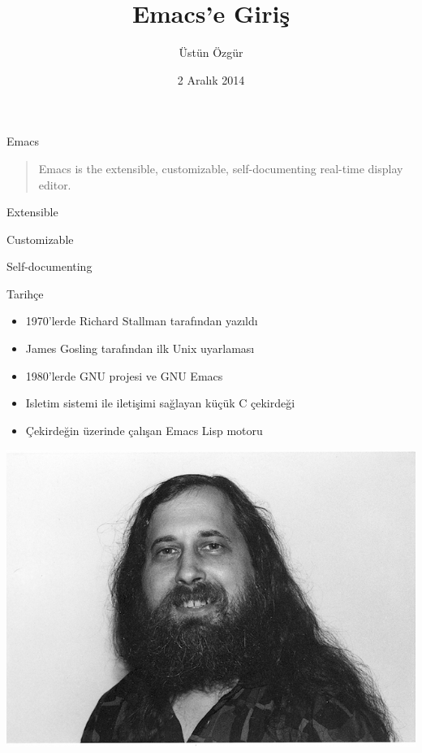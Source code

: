 \documentclass[presentation]{beamer}
\author{Üstün Özgür}
\date{2 Aralık 2014}
\title{Emacs'e Giriş}
\begin{document}
\maketitle


\begin{frame}[label=sec-1]{Emacs}
\begin{quote}
Emacs is the extensible, customizable, self-documenting real-time display
editor.
\end{quote}

\begin{block}{Extensible}
\end{block}
\begin{block}{Customizable}
\end{block}
\begin{block}{Self-documenting}
\end{block}
\end{frame}

\begin{frame}[label=sec-2]{Tarihçe}
\begin{itemize}
\item 1970'lerde Richard Stallman tarafından yazıldı
\item James Gosling tarafından ilk Unix uyarlaması
\item 1980'lerde GNU projesi ve GNU Emacs
\item Isletim sistemi ile iletişimi sağlayan küçük C çekirdeği
\item Çekirdeğin üzerinde çalışan Emacs Lisp motoru
\end{itemize}

\includegraphics[width=.9\linewidth]{./images/stall.jpg}
\end{frame}
\end{document}
